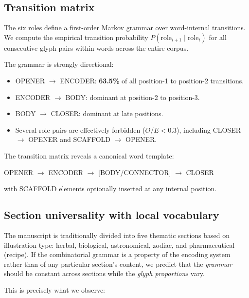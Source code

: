 \subsection{Transition matrix}

The six roles define a first-order Markov grammar over word-internal
transitions. We compute the empirical transition probability
$P(\text{role}_{i+1} \mid \text{role}_i)$ for all consecutive glyph
pairs within words across the entire corpus.

The grammar is strongly directional:

\begin{itemize}[nosep]
  \item OPENER $\to$ ENCODER: \textbf{63.5\%} of all position-1 to
    position-2 transitions.
  \item ENCODER $\to$ BODY: dominant at position-2 to position-3.
  \item BODY $\to$ CLOSER: dominant at late positions.
  \item Several role pairs are effectively forbidden ($O/E < 0.3$),
    including CLOSER $\to$ OPENER and SCAFFOLD $\to$ OPENER.
\end{itemize}

The transition matrix reveals a canonical word template:

\begin{center}
\textsc{OPENER} $\to$ \textsc{ENCODER} $\to$
[\textsc{BODY}/\textsc{CONNECTOR}] $\to$ \textsc{CLOSER}
\end{center}

\noindent with SCAFFOLD elements optionally inserted at any internal
position.


\subsection{Section universality with local vocabulary}
\label{sec:sections}

The manuscript is traditionally divided into five thematic sections
based on illustration type: herbal, biological, astronomical, zodiac,
and pharmaceutical (recipe). If the combinatorial grammar is a property
of the encoding system rather than of any particular section's content,
we predict that the \emph{grammar} should be constant across sections
while the \emph{glyph proportions} vary.

This is precisely what we observe:

